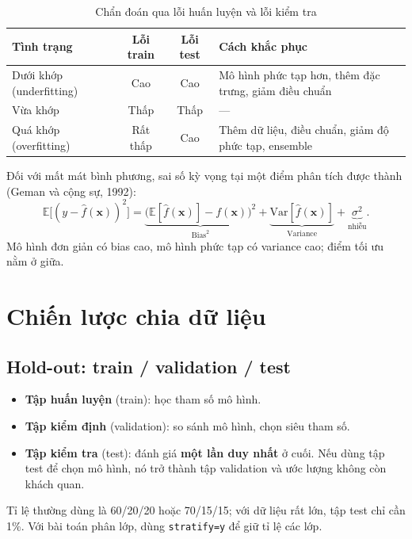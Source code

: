 \begin{table}[H]
\centering
\begin{tabular}{|l|c|c|p{5.5cm}|}
\hline
\textbf{Tình trạng} & \textbf{Lỗi train} & \textbf{Lỗi test} & \textbf{Cách khắc phục} \\
\hline
Dưới khớp (underfitting) & Cao & Cao & Mô hình phức tạp hơn, thêm đặc trưng, giảm điều chuẩn \\ \hline
Vừa khớp & Thấp & Thấp & --- \\ \hline
Quá khớp (overfitting) & Rất thấp & Cao & Thêm dữ liệu, điều chuẩn, giảm độ phức tạp, ensemble \\ \hline
\end{tabular}
\caption{Chẩn đoán qua lỗi huấn luyện và lỗi kiểm tra}
\end{table}

Đối với mất mát bình phương, sai số kỳ vọng tại một điểm phân tích được thành (Geman và cộng sự, 1992):
\begin{equation}
    \label{eq:bias-variance}
    \mathbb{E}\big[(y - \hat{f}(\mathbf{x}))^2\big] =\underbrace{\big(\mathbb{E}[\hat{f}(\mathbf{x})] - f(\mathbf{x})\big)^2}_{\text{Bias}^2} + \underbrace{\mathrm{Var}[\hat{f}(\mathbf{x})]}_{\text{Variance}} + \underbrace{\sigma^2}_{\text{nhiễu}} .
\end{equation}
Mô hình đơn giản có bias cao, mô hình phức tạp có variance cao; điểm tối ưu nằm ở giữa.


\section{Chiến lược chia dữ liệu}

\subsection{Hold-out: train / validation / test}

\begin{itemize}
    \item \textbf{Tập huấn luyện} (train): học tham số mô hình.
    \item \textbf{Tập kiểm định} (validation): so sánh mô hình, chọn siêu tham số.
    \item \textbf{Tập kiểm tra} (test): đánh giá \textbf{một lần duy nhất} ở cuối. Nếu dùng tập test để chọn mô hình, nó trở thành tập validation và ước lượng không còn khách quan.
\end{itemize}
Tỉ lệ thường dùng là 60/20/20 hoặc 70/15/15; với dữ liệu rất lớn, tập test chỉ cần 1\%. Với bài toán phân lớp, dùng \texttt{stratify=y} để giữ tỉ lệ các lớp.

